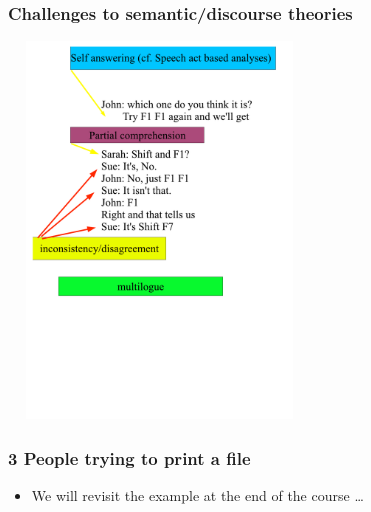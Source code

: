 \documentclass{beamer}
\newcommand{\bit}{\begin{itemize}}
\newcommand{\eit}{\end{itemize}}
\begin{document}
\begin{frame}\frametitle{Challenges to semantic/discourse theories}

\includegraphics[height=10cm,width=8cm]{challenges1.pdf}




\end{frame}

\begin{frame}\frametitle{3 People trying to print a file}

\bit

\item We will revisit the example at the end of the course \ldots
\eit


\end{frame}
\end{document}
